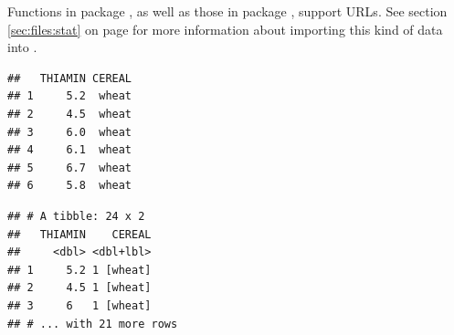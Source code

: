 \documentclass[krantz2]{krantz}\usepackage{knitr}
\begin{document}
\begin{knitrout}\footnotesize
{}\color{fgcolor}\begin{kframe}
\begin{alltt}
\hlstd{(}\hlstd{,}
              \hlstd{,}
               \hlstd{=} \hlstd{)}
\end{alltt}
\end{kframe}
\end{knitrout}

Functions in package , as well as those in package , support URLs. See section \ref{sec:files:stat} on page \pageref{sec:files:stat} for more information about importing this kind of data into \Rlang.

\begin{knitrout}\footnotesize
{}\color{fgcolor}\begin{kframe}
\begin{alltt}
 \hlkwb{<-}
  \hlstd{(} \hlstd{=} \hlstd{,}
             \hlstd{=} \hlstd{)}
\end{alltt}
\begin{verbatim}
##   THIAMIN CEREAL
## 1     5.2  wheat
## 2     4.5  wheat
## 3     6.0  wheat
## 4     6.1  wheat
## 5     6.7  wheat
## 6     5.8  wheat
\end{verbatim}
\end{kframe}
\end{knitrout}

\begin{knitrout}\footnotesize
{}\color{fgcolor}\begin{kframe}
\begin{alltt}
 \hlkwb{<-}
    \hlstd{(} \hlstd{=} \hlstd{)}
\end{alltt}
\begin{verbatim}
## # A tibble: 24 x 2
##   THIAMIN    CEREAL
##     <dbl> <dbl+lbl>
## 1     5.2 1 [wheat]
## 2     4.5 1 [wheat]
## 3     6   1 [wheat]
## # ... with 21 more rows
\end{verbatim}
\end{kframe}
\end{knitrout}
\end{document}
